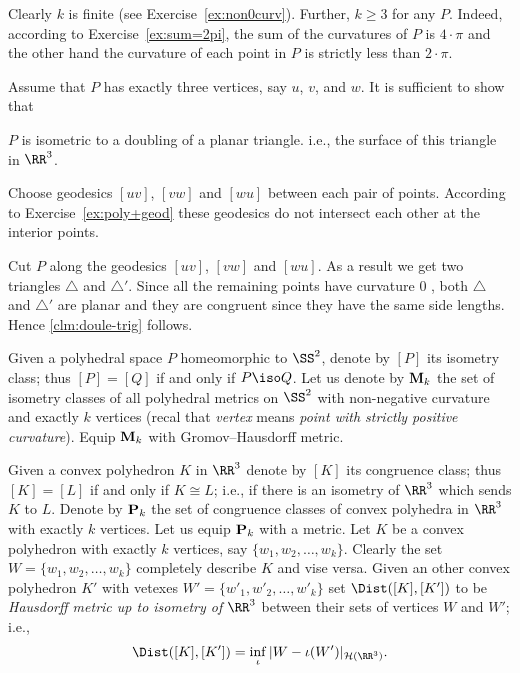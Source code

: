 Clearly $k$ is finite (see Exercise~\ref{ex:non0curv}).
Further, $k\ge 3$ for any $P$.
Indeed, according to  Exercise~\ref{ex:sum=2pi}, 
the sum of the curvatures of $P$ is $4\cdot\pi$ 
and the other hand the curvature of each point in $P$ is strictly less than $2\cdot\pi$.


Assume that $P$ has exactly three vertices, say $u$, $v$, and $w$. 
It is sufficient to show that 
\begin{clm}{}\label{clm:doule-trig}
$P$ is isometric to a
doubling of a planar triangle.
i.e., the surface of this triangle in $\RR^3$.
\end{clm}

Choose geodesics  $[uv]$, $[vw]$ and $[wu]$ between each pair of points.
According to Exercise~\ref{ex:poly+geod}
these geodesics do not intersect each other at the interior points. 

Cut $P$ along the geodesics $[uv]$, $[vw]$ and $[wu]$.
As a result we get two triangles $\triangle$ and $\triangle'$.
Since all the remaining points have curvature $0$%
,
both $\triangle$ and $\triangle'$ are planar
and 
they are congruent since they have the same side lengths.
Hence \ref{clm:doule-trig} follows.

Given a polyhedral space $P$ homeomorphic to $\SS^2$,
denote by $[P]$ its isometry class;
thus $[P]=[Q]$ if and only if $P\iso Q$.
Let us denote by $\text{\bf M}_k$ the set of isometry classes of all polyhedral metrics on $\SS^2$  with non-negative curvature and exactly $k$ vertices (recal that \textit{vertex} means \textit{point with strictly positive curvature}).
Equip $\text{\bf M}_k$ with Gromov--Hausdorff metric.

Given a convex polyhedron $K$ in $\RR^3$ denote by $[K]$ its congruence class;
thus $[K]=[L]$ if and only if $K\cong L$; i.e., if there is an isometry of $\RR^3$ which sends $K$ to $L$.
Denote by $\text{\bf P}_k$ the set of congruence classes of convex polyhedra in $\RR^3$
with exactly $k$ vertices.
Let us equip $\text{\bf P}_k$ with a metric.
Let $K$ be  a convex polyhedron with exactly $k$ vertices,
say $\{w_1,w_2,\dots,w_k\}$.
Clearly the set $W=\{w_1,w_2,\dots,w_k\}$ completely describe $K$ and vise versa.
Given an other convex polyhedron $K'$ with vetexes $W'=\{w'_1,w'_2,\dots,w'_k\}$
set $\Dist([K],[K'])$
to be \emph{Hausdorff metric up to isometry of $\RR^3$} between their sets of vertices $W$ and $W'$;
i.e.,
$$\Dist([K],[K'])=\inf_{\iota} |W-\iota(W')|_{\mathcal{H}(\RR^3)}.$$

